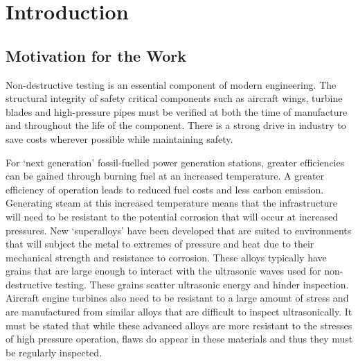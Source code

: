 \chapter{Introduction}

\section{Motivation for the Work}\label{sec:motivation}
Non-destructive testing is an essential component of modern engineering. The structural integrity of safety critical components such as aircraft wings, turbine blades and high-pressure pipes must be verified at both the time of manufacture and throughout the life of the component\cite{zhao_active_2007}. There is a strong drive in industry to save costs wherever possible while maintaining safety\cite{roscoe_cost-effective_1995}. 

For `next generation' fossil-fuelled power generation stations, greater efficiencies can be gained through burning fuel at an increased temperature\cite{viswanathan_u.s._2005,novikov_efficiency_1958}. A greater efficiency of operation leads to reduced fuel costs and less carbon emission\cite{viswanathan_materials_2006,descamps_efficiency_2008}. Generating steam at this increased temperature means that the infrastructure will need to be resistant to the potential corrosion that will occur at increased pressures\cite{ennis_recent_2003,viswanathan_materials_2001}. New `superalloys' have been developed that are suited to environments that will subject the metal to extremes of pressure and heat due to their mechanical strength and resistance to corrosion\cite{hayner_next_2004,masuyama_history_2001,klueh_ferritic/martensitic_2007}. These alloys typically have grains that are large enough to interact with the ultrasonic waves used for non-destructive testing\cite{jiang_grain_1998}. These grains scatter ultrasonic energy and hinder inspection\cite{was_influence_1981}. Aircraft engine turbines also need to be resistant to a large amount of stress and are manufactured from similar alloys that are difficult to inspect ultrasonically. It must be stated that while these advanced alloys are more resistant to the stresses of high pressure operation, flaws do appear in these materials and thus they must be regularly inspected\cite{diboine_creep_1987,ford_development_1988,ennis_microstructural_1997}.

